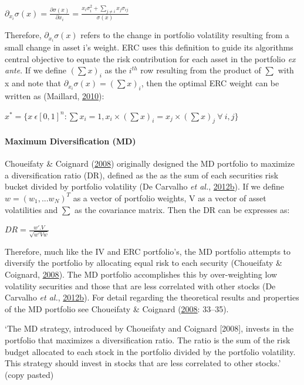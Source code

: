 \documentclass[11pt,preprint, authoryear]{elsarticle}
\numberwithin{equation}{section}
\numberwithin{figure}{section}
\numberwithin{table}{section}
\begin{document}
\(\partial_{x_i}\sigma(x)=\frac{\partial\sigma(x)}{\partial x_i}=\frac{x_i\sigma_i^2+\sum_{j\neq i}x_j\sigma_{ij}}{\sigma(x)}\)

Therefore, \(\partial_{x_i}\sigma(x)\) refers to the change in portfolio
volatility resulting from a small change in asset i's weight. ERC uses
this definition to guide its algorithms central objective to equate the
risk contribution for each asset in the portfolio \emph{ex ante}. If we
define \((\sum x)_i\) as the \(i^{th}\) row resulting from the product
of \(\sum\) with x and note that \(\partial_{x_i}\sigma(x)=(\sum x)_i\),
then the optimal ERC weight can be written as (Maillard,
\protect\hyperlink{ref-maillard2010}{2010}):

\(x^*=\{x \ \epsilon[0,1]^n:\sum x_i=1, x_i \times (\sum x)_i=x_j \times (\sum x)_j \ \forall \ i,j \}\)

\hypertarget{maximum-diversification-md}{%
\paragraph{Maximum Diversification
(MD)}\label{maximum-diversification-md}}

Choueifaty \& Coignard (\protect\hyperlink{ref-choueifaty2008}{2008})
originally designed the MD portfolio to maximize a diversification ratio
(DR), defined as the as the sum of each securities risk bucket divided
by portfolio volatility (De Carvalho \emph{et al.},
\protect\hyperlink{ref-leote}{2012}\protect\hyperlink{ref-leote}{b}). If
we define \(w=(w_1,...w_N)^T\) as a vector of portfolio weights, V as a
vector of asset volatilities and \(\sum\) as the covariance matrix. Then
the DR can be expresses as:

\(DR= \frac{w'.V}{\sqrt{w'Vw}}\)

Therefore, much like the IV and ERC portfolio's, the MD portfolio
attempts to diversify the portfolio by allocating equal risk to each
security (Choueifaty \& Coignard,
\protect\hyperlink{ref-choueifaty2008}{2008}). The MD portfolio
accomplishes this by over-weighting low volatility securities and those
that are less correlated with other stocks (De Carvalho \emph{et al.},
\protect\hyperlink{ref-leote}{2012}\protect\hyperlink{ref-leote}{b}).
For detail regarding the theoretical results and properties of the MD
portfolio see Choueifaty \& Coignard
(\protect\hyperlink{ref-choueifaty2008}{2008}: 33--35).

`The MD strategy, introduced by Choueifaty and Coignard {[}2008{]},
invests in the portfolio that maximizes a diversification ratio. The
ratio is the sum of the risk budget allocated to each stock in the
portfolio divided by the portfolio volatility. This strategy should
invest in stocks that are less correlated to other stocks.' (copy
pasted)
\end{document}
